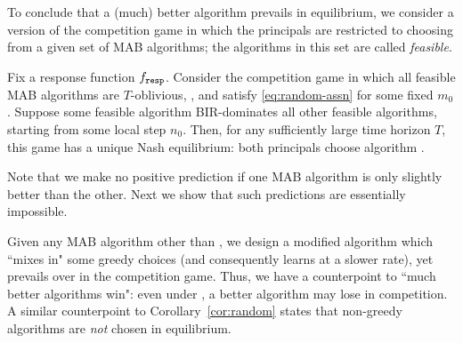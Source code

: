To conclude that a (much) better algorithm prevails in equilibrium, we consider a version of the competition game in which the principals are restricted to choosing from a given set of MAB algorithms; the algorithms in this set are called \emph{feasible}.


\begin{corollary}\label{cor:random}
Fix a \HardMaxRandom response function $f_{\mathtt{resp}}$. Consider the competition game in which all feasible MAB algorithms are $T$-oblivious, \bmonotone, and satisfy \eqref{eq:random-assn} for some fixed $m_0$. Suppose some feasible algorithm \alg  BIR-dominates all other feasible algorithms, starting from some local step $n_0$. Then, for any sufficiently large time horizon $T$, this game has a unique Nash equilibrium: both principals choose algorithm \alg.
\end{corollary}

Note that we make no positive prediction if one MAB algorithm is only slightly better than the other. Next we show that such predictions are essentially impossible.


Given any \bmonotone MAB algorithm \alg other than \DynGreedy, we design a modified algorithm which ``mixes in" some greedy choices (and consequently learns at a slower rate), yet prevails over \alg in the competition game. Thus, we have a counterpoint to ``much better algorithms win": even under \HardMaxRandom, a better algorithm may lose in competition. A similar counterpoint to Corollary~\ref{cor:random} states that non-greedy algorithms are \emph{not} chosen in equilibrium.


